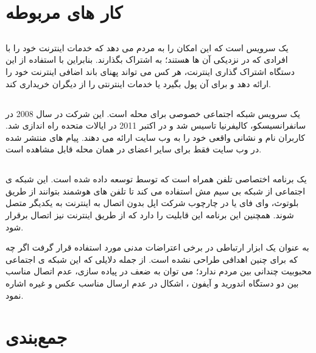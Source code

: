 \section{کار های مربوطه}
\subsection{}
 \href{https://www.opengarden.com}{}%
یک سرویس است که این امکان را به مردم می دهد که  خدمات اینترنت خود را با افرادی که در نزدیکی آن ها هستند؛ به اشتراک بگذارند. بنابراین با استفاده از این دستگاه اشتراک گذاری اینترنت، هر کس می تواند پهنای باند اضافی اینترنت خود را ارائه دهد و برای آن پول بگیرد یا خدمات اینترنتی را از دیگران خریداری کند.

\subsection{} 
  \href{https://nextdoor.com/}{}%
یک سرویس شبکه اجتماعی خصوصی برای محله است. این شرکت در سال 2008 در سانفرانسیسکو، کالیفرنیا تاسیس شد و در اکتبر 2011 در ایالات متحده راه اندازی شد. کاربران 
نام و نشانی واقعی خود را به وب سایت ارائه می دهند. پیام های منتشر شده در وب سایت فقط برای سایر اعضای  
در همان محله قابل مشاهده است.
\subsection{}
 \href{https://www.opengarden.com/firechat/}{}%
یک برنامه اختصاصی تلفن همراه است که توسط
توسعه داده شده است. این شبکه ی اجتماعی از شبکه بی سیم مش استفاده می کند تا تلفن های هوشمند بتوانند از طریق بلوتوث، وای فای یا در چارچوب
شرکت اپل بدون اتصال به اینترنت به یکدیگر متصل شوند. همچنین این برنامه این قابلیت را دارد که از طریق اینترنت نیز اتصال برقرار شود.

به عنوان یک ابزار ارتباطی در برخی اعتراضات مدنی مورد استفاده قرار گرفت اگر چه که برای چنین اهدافی طراحی نشده است. از جمله دلایلی که این شبکه ی اجتماعی محبوبیت چندانی بین مردم ندارد؛ می توان به ضعف در پیاده سازی، عدم اتصال مناسب بین دو دستگاه اندورید
و آیفون
، اشکال در عدم ارسال مناسب عکس و غیره اشاره نمود.    
  
\section{جمع‌بندی}
